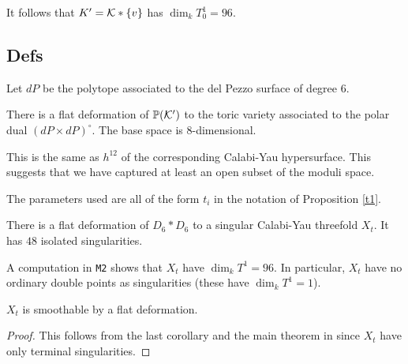 \documentclass[11pt, english]{article}
\begin{document}
It follows that $K'= \mathcal K \ast \{ v \}$ has $\dim_k T^1_0 = 96$. 

\subsection{Defs}

Let $dP$ be the polytope associated to the del Pezzo surface of degree $6$.

\begin{prop}
There is a flat deformation of $\mathbb{P}(\mathcal K')$ to the toric variety associated to the polar dual $(dP \times dP)^\circ$. The base space is $8$-dimensional.
\end{prop}
\begin{remark}
This is the same as $h^{12}$ of the corresponding Calabi-Yau hypersurface. This suggests that we have captured at least an open subset of the moduli space.
\end{remark}

The parameters used are all of the form $t_i$ in the notation of Proposition \ref{t1}.

\begin{corr}
There is a flat deformation of $D_6 \ast D_6$ to a singular Calabi-Yau threefold $X_t$. It has $48$ isolated singularities.

A computation in \verb|M2| shows that $X_t$ have $\dim_k T^1=96$. In particular, $X_t$ have no ordinary double points as singularities (these have $\dim_k T^1=1$).
\end{corr}

\begin{prop}
$X_t$ is smoothable by a flat deformation.
\end{prop}
\begin{proof}
This follows from the last corollary and the main theorem in \cite{namikawa_localmoduli} since $X_t$ have only terminal singularities. 
\end{proof}

 
 
\end{document}
